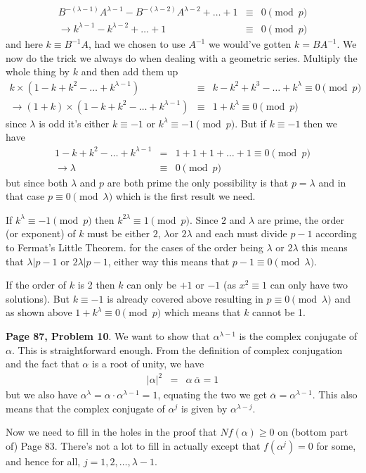 \documentclass[aps,preprint,preprintnumbers,nofootinbib,showpacs,prd]{revtex4-1}
\newcommand{\nbea}{\begin{eqnarray*}}
\newcommand{\neea}{\end{eqnarray*}}
\begin{document}
%
\nbea
B^{-(\lambda - 1)}A^{\lambda-1} - B^{-(\lambda - 2)}A^{\lambda - 2}  + \dots + 1 & \equiv & 0 \pmod{p} \\
\to k^{\lambda-1} - k^{\lambda - 2} +  \dots + 1 & \equiv & 0 \pmod{p}
\neea
%
and here $k \equiv B^{-1}A$, had we chosen to use $A^{-1}$ we would've gotten $k = BA^{-1}$. We now do the trick we always do when dealing with a geometric series. Multiply the whole thing by $k$ and then add them up
%
\nbea
k \times (1 - k + k^2 - \dots + k^{\lambda - 1}) & \equiv & k - k^2 + k^3 - \dots + k^{\lambda} \equiv 0 \pmod{p} \\
\to (1 + k) \times (1 - k + k^2 - \dots + k^{\lambda - 1})  & \equiv & 1 + k^{\lambda} \equiv 0 \pmod{p}
\neea
%
since $\lambda$ is odd it's either $k \equiv -1$ or $k^{\lambda} \equiv -1 \pmod{p}$. But if $k \equiv -1$ then we have
%
\nbea
1 - k + k^2 - \dots + k^{\lambda - 1} & = & 1 + 1 + 1 + \dots + 1 \equiv 0 \pmod{p} \\
\to \lambda & \equiv & 0 \pmod{p}
\neea
%
but since both $\lambda$ and $p$ are both prime the only possibility is that $p = \lambda$ and in that case $p \equiv 0 \pmod{\lambda}$ which is the first result we need.

If $k^{\lambda} \equiv -1 \pmod{p}$ then $k^{2\lambda} \equiv 1 \pmod{p}$. Since $2$ and $\lambda$ are prime, the order (or exponent) of $k$ must be either $2$, $\lambda$or $2\lambda$ and each must divide $p - 1$ according to Fermat's Little Theorem. for the cases of the order being $\lambda$ or $2\lambda$ this means that $\lambda|p-1$ or $2\lambda|p-1$, either way this means that $p - 1 \equiv 0 \pmod{\lambda}$.

If the order of $k$ is 2 then $k$ can only be $+1$ or $-1$ (as $x^2 \equiv 1$ can only have two solutions). But $k \equiv -1$ is already covered above resulting in $p \equiv 0 \pmod{\lambda}$ and as shown above $1 + k^\lambda \equiv 0 \pmod{p}$ which means that $k$ cannot be 1.

{\bf Page 87, Problem 10}. We want to show that $\alpha^{\lambda-1}$ is the complex conjugate of $\alpha$. This is straightforward enough. From the definition of complex conjugation and the fact that $\alpha$ is a root of unity, we have
%
\nbea
|\alpha|^2 & = & \alpha ~\overline{\alpha} = 1
\neea
%
but we also have $\alpha^{\lambda} = \alpha \cdot \alpha^{\lambda-1} = 1$, equating the two we get $\overline{\alpha} = \alpha^{\lambda-1}$. This also means that the complex conjugate of $\alpha^j$ is given by $\alpha^{\lambda-j}$.

Now we need to fill in the holes in the proof that $Nf(\alpha) \ge 0$ on (bottom part of) Page 83. There's not a lot to fill in actually except that $f(\alpha^j) = 0$ for some, and hence for all, $j = 1,2,\dots, \lambda-1$.
\end{document}
